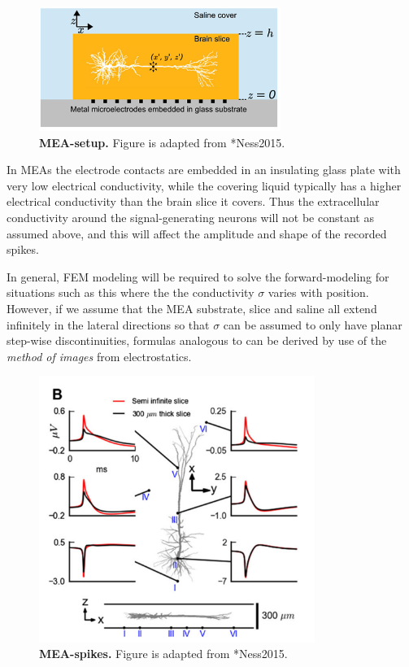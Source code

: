 \begin{figure}[!ht]
\begin{center}
\includegraphics[width=0.7\textwidth]{Figures/Spikes/Spikes-MEA-1-w43-r300}
\end{center}
\caption[]{\textbf{MEA-setup.}
Figure is adapted from \citeasnoun**{Ness2015}.}
\label{fig:Spikes:MEA-setup}
\end{figure}

In MEAs the electrode contacts are embedded in an insulating glass plate with very 
low electrical conductivity, while the covering liquid typically has a higher electrical conductivity 
than the brain slice it covers. Thus the extracellular conductivity around the signal-generating neurons
will not be constant as assumed above, and this will affect the amplitude and shape of the recorded 
spikes. 

In general, FEM modeling will be required to solve the forward-modeling for situations such as this where
the the conductivity $\sigma$ varies with position. However, if we assume that the MEA substrate, slice and saline
all extend infinitely in the lateral directions so that $\sigma$ can be assumed to only have planar step-wise discontinuities, 
formulas analogous to  can be derived by use of the
\emph{method of images} from electrostatics. 


\begin{figure}[!ht]
\begin{center}
\includegraphics[width=0.8\textwidth]{Figures/Spikes/Spikes-MEA-2-w43-r300}
\end{center}
\caption[]{\textbf{MEA-spikes.}
Figure is adapted from \citeasnoun**{Ness2015}.}
\label{fig:Spikes:MEA-spikes}
\end{figure}

